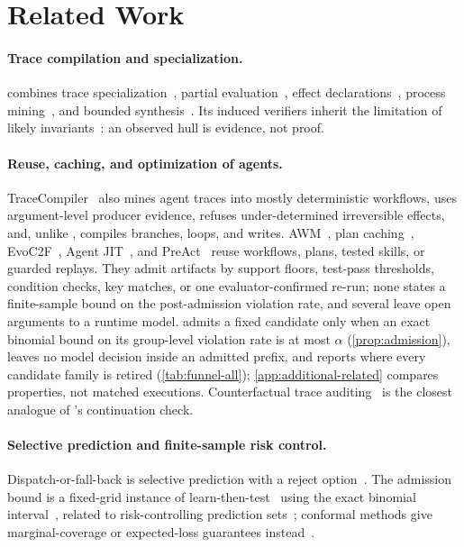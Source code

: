 \section{Related Work}
\label{sec:related}

\paragraph{Trace compilation and specialization.}
\method combines trace specialization~\citep{bolz2009pypy}, partial
evaluation~\citep{futamura1971partial,jones1993partial}, effect
declarations~\citep{lucassen1988effects}, process mining~\citep{vanderAalst2016process},
and bounded synthesis~\citep{gulwani2011flashfill,solarlezama2006sketching}.
Its induced verifiers inherit the limitation of likely
invariants~\citep{ernst2001daikon}: an observed hull is evidence, not proof.

\paragraph{Reuse, caching, and optimization of agents.}
TraceCompiler~\citep{elyadouni2026tracecompiler} also mines agent traces into
mostly deterministic workflows, uses argument-level producer evidence, refuses
under-determined irreversible effects, and, unlike \method, compiles branches,
loops, and writes. AWM~\citep{wang2025awm}, plan
caching~\citep{zhang2025plancache}, EvoC2F~\citep{wei2026evoc2f}, Agent
JIT~\citep{winston2026agentjit}, and PreAct~\citep{li2026preact} reuse
workflows, plans, tested skills, or guarded replays. They
admit artifacts by support floors, test-pass thresholds, condition checks, key
matches, or one evaluator-confirmed re-run; none states a finite-sample bound on
the post-admission violation rate, and several leave open arguments to a runtime
model. \method admits a fixed candidate only when an exact binomial bound on its
group-level violation rate is at most $\alpha$ (\cref{prop:admission}), leaves no
model decision inside an admitted prefix, and reports where every candidate
family is retired (\cref{tab:funnel-all}); \cref{app:additional-related}
compares properties, not matched executions. Counterfactual trace auditing~\citep{zhou2026cta} is the closest
analogue of \method's continuation check.

\paragraph{Selective prediction and finite-sample risk control.}
Dispatch-or-fall-back is selective prediction with a reject
option~\citep{chow1970reject,geifman2017selective}. The admission bound is a
fixed-grid instance of learn-then-test~\citep{angelopoulos2022ltt} using the
exact binomial interval~\citep{clopper1934binomial}, related to risk-controlling
prediction sets~\citep{bates2021rcps}; conformal methods give marginal-coverage
or expected-loss guarantees instead~\citep{vovk2005algorithmic,angelopoulos2024crc}.

